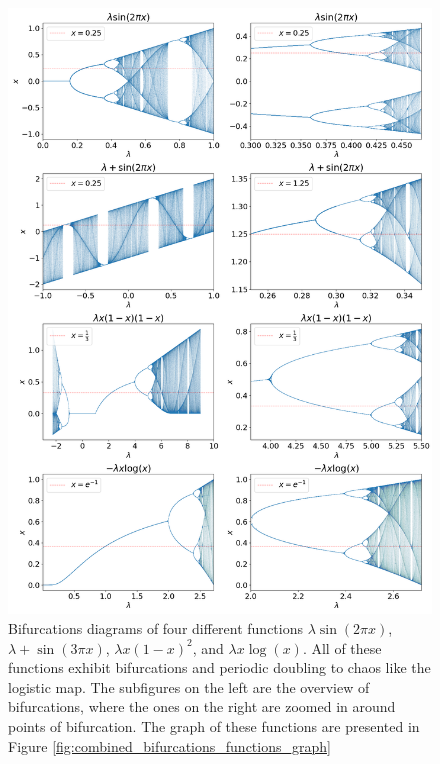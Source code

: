 \begin{figure}
	\centering
	\includegraphics[width=\textwidth]{./figures/combined_bifurcations.png}
	\caption{
		Bifurcations diagrams of four different functions 
		$ \lambda \sin(2\pi x)$,
		$ \lambda + \sin(3\pi x)$,
		$ \lambda x(1-x)^2$,
		and $ \lambda x \log(x)$.
		All of these functions exhibit bifurcations and periodic doubling to chaos like the logistic map. 
		The subfigures on the left are the overview of bifurcations, where the ones on the right are zoomed in around points of bifurcation.
		The graph of these functions are presented in Figure \ref{fig:combined_bifurcations_functions_graph}
	}
	\label{fig:combined_bifurcations}
\end{figure}

